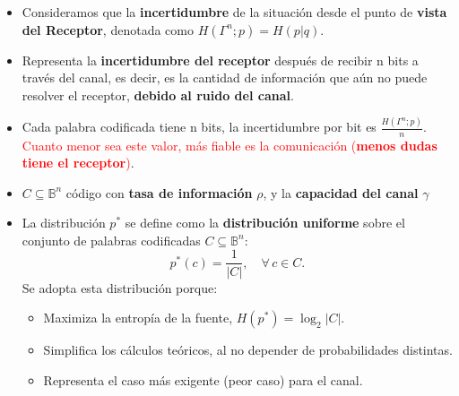 \documentclass{beamer}
\theoremstyle{plain}
\theoremstyle{example}
\theoremstyle{example}
\begin{document}
\begin{frame}  \small  
\begin{itemize} 
\item  Consideramos que la \textbf{incertidumbre} de la situación desde el punto de \textbf{vista del Receptor}, denotada como $H(\Gamma^n;p) = H(p | q)$.

\item Representa la \textbf{incertidumbre del receptor} después de recibir n bits a través del canal, es decir, es la cantidad de información que aún no puede resolver el receptor, \textbf{debido al ruido del canal}.

\item Cada palabra codificada tiene n bits, la incertidumbre por bit es $\frac{H(\Gamma^n;p)}{n}$. \textcolor{red}{Cuanto menor sea este valor, más fiable es la comunicación (\textbf{menos dudas tiene el receptor})}.

\item $C \subseteq \mathbb{B}^n$  código con \textbf{tasa de información} $\rho$,
 y la \textbf{capacidad del canal} $\gamma$

\item La distribución $p^*$ se define como la \textbf{distribución uniforme} sobre el conjunto de palabras codificadas $C \subseteq \mathbb{B}^n$:
\[
p^*(c) = \frac{1}{|C|}, \quad \forall\, c \in C.
\]
Se adopta esta distribución porque:
\begin{itemize}
  \item Maximiza la entropía de la fuente, $H(p^*) = \log_2 |C|$.
  \item Simplifica los cálculos teóricos, al no depender de probabilidades distintas.
  \item Representa el caso más exigente (peor caso) para el canal.
\end{itemize}

\end{itemize} 
\end{frame} 
\end{document}
